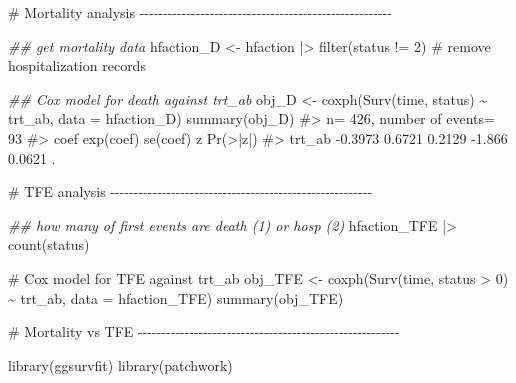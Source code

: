 \documentclass[
  letterpaper,
  DIV=11,
  numbers=noendperiod]{scrreprt}
\newenvironment{Shaded}{\begin{snugshade}}{\end{snugshade}}
\newcommand{\AttributeTok}[1]{\textcolor[rgb]{0.40,0.45,0.13}{#1}}
\newcommand{\CommentTok}[1]{\textcolor[rgb]{0.37,0.37,0.37}{#1}}
\newcommand{\DecValTok}[1]{\textcolor[rgb]{0.68,0.00,0.00}{#1}}
\newcommand{\DocumentationTok}[1]{\textcolor[rgb]{0.37,0.37,0.37}{\textit{#1}}}
\newcommand{\FunctionTok}[1]{\textcolor[rgb]{0.28,0.35,0.67}{#1}}
\newcommand{\NormalTok}[1]{\textcolor[rgb]{0.00,0.23,0.31}{#1}}
\newcommand{\OtherTok}[1]{\textcolor[rgb]{0.00,0.23,0.31}{#1}}
\newcommand{\SpecialCharTok}[1]{\textcolor[rgb]{0.37,0.37,0.37}{#1}}
\begin{document}
\begin{Shaded}
\begin{Highlighting}[]
\CommentTok{\# Mortality analysis {-}{-}{-}{-}{-}{-}{-}{-}{-}{-}{-}{-}{-}{-}{-}{-}{-}{-}{-}{-}{-}{-}{-}{-}{-}{-}{-}{-}{-}{-}{-}{-}{-}{-}{-}{-}{-}{-}{-}{-}{-}{-}{-}{-}{-}{-}{-}{-}{-}{-}{-}{-}{-}{-}}

\DocumentationTok{\#\# get mortality data}
\NormalTok{hfaction\_D }\OtherTok{\textless{}{-}}\NormalTok{ hfaction }\SpecialCharTok{|\textgreater{}} 
  \FunctionTok{filter}\NormalTok{(status }\SpecialCharTok{!=} \DecValTok{2}\NormalTok{) }\CommentTok{\# remove hospitalization records}

\DocumentationTok{\#\# Cox model for death against trt\_ab}
\NormalTok{obj\_D }\OtherTok{\textless{}{-}} \FunctionTok{coxph}\NormalTok{(}\FunctionTok{Surv}\NormalTok{(time, status) }\SpecialCharTok{\textasciitilde{}}\NormalTok{ trt\_ab, }\AttributeTok{data =}\NormalTok{ hfaction\_D)}
\FunctionTok{summary}\NormalTok{(obj\_D)}
\CommentTok{\#\textgreater{} n= 426, number of events= 93 }
\CommentTok{\#\textgreater{} coef exp(coef) se(coef)      z Pr(\textgreater{}|z|)  }
\CommentTok{\#\textgreater{} trt\_ab {-}0.3973    0.6721   0.2129 {-}1.866   0.0621 .}

\CommentTok{\# TFE analysis {-}{-}{-}{-}{-}{-}{-}{-}{-}{-}{-}{-}{-}{-}{-}{-}{-}{-}{-}{-}{-}{-}{-}{-}{-}{-}{-}{-}{-}{-}{-}{-}{-}{-}{-}{-}{-}{-}{-}{-}{-}{-}{-}{-}{-}{-}{-}{-}{-}{-}{-}{-}{-}{-}{-}{-}}

\DocumentationTok{\#\# how many of first events are death (1) or hosp (2)}
\NormalTok{hfaction\_TFE }\SpecialCharTok{|\textgreater{}} 
  \FunctionTok{count}\NormalTok{(status)}

\CommentTok{\# Cox model for TFE against trt\_ab}
\NormalTok{obj\_TFE }\OtherTok{\textless{}{-}} \FunctionTok{coxph}\NormalTok{(}\FunctionTok{Surv}\NormalTok{(time, status }\SpecialCharTok{\textgreater{}} \DecValTok{0}\NormalTok{) }\SpecialCharTok{\textasciitilde{}}\NormalTok{ trt\_ab, }\AttributeTok{data =}\NormalTok{ hfaction\_TFE)}
\FunctionTok{summary}\NormalTok{(obj\_TFE)}


\CommentTok{\# Mortality vs TFE {-}{-}{-}{-}{-}{-}{-}{-}{-}{-}{-}{-}{-}{-}{-}{-}{-}{-}{-}{-}{-}{-}{-}{-}{-}{-}{-}{-}{-}{-}{-}{-}{-}{-}{-}{-}{-}{-}{-}{-}{-}{-}{-}{-}{-}{-}{-}{-}{-}{-}{-}{-}{-}{-}{-}{-}}

\FunctionTok{library}\NormalTok{(ggsurvfit)}
\FunctionTok{library}\NormalTok{(patchwork)}


\end{Highlighting}
\end{Shaded}
\end{document}
